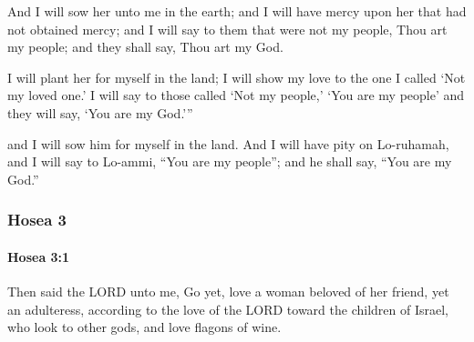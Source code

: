 			\begin{versebox}
					\item[BHS] 
					\item[LXX] 
					\item[ASV] And I will sow her unto me in the earth; and I will have mercy upon her that had not obtained mercy; and I will say to them that were not my people, Thou art my people; and they shall say, Thou art my God.
					\item[NIV] I will plant her for myself in the land; I will show my love to the one I called ‘Not my loved one.’ I will say to those called ‘Not my people,’ ‘You are my people’ and they will say, ‘You are my God.’”
					\item[NRSV] and I will sow him for myself in the land. And I will have pity on Lo-ruhamah, and I will say to Lo-ammi, “You are my people”; and he shall say, “You are my God.”
			\end{versebox}
	\subsubsection{Hosea 3} %
		\label{HOSEA-3}

		\paragraph{Hosea 3:1} %
			\label{HOSEA-3-1}

			Then said the LORD unto me, Go yet, love a woman beloved of her friend, yet an adulteress, according to the love of the LORD toward the children of Israel, who look to other gods, and love flagons of wine.

